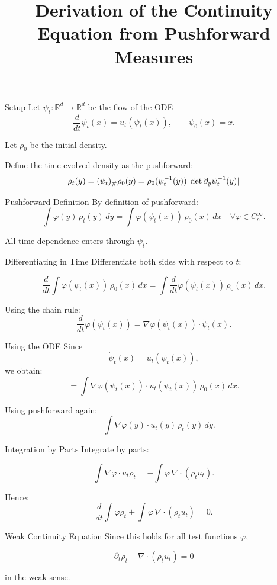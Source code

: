 \documentclass{beamer}
\title{Derivation of the Continuity Equation from Pushforward Measures}
\author{}
\date{}
\begin{document}
\frame{\titlepage}


\begin{frame}{Setup}
Let $\psi_t : \mathbb{R}^d \to \mathbb{R}^d$ be the flow of the ODE
\[
\frac{d}{dt} \psi_t(x) = u_t(\psi_t(x)),
\qquad \psi_0(x) = x.
\]

Let $\rho_0$ be the initial density.

Define the time-evolved density as the pushforward:
\[
\rho_t (y) = (\psi_t)_\# \rho_0 (y) = \rho_0(\psi_t^{-1}(y)) | \operatorname{det} \partial_y \psi_t^{-1}(y)|
\]

\end{frame}


\begin{frame}{Pushforward Definition}
By definition of pushforward:
\[
\int \varphi(y)\,\rho_t(y)\,dy
=
\int \varphi(\psi_t(x))\,\rho_0(x)\,dx
\quad \forall \varphi \in C_c^\infty.
\]

All time dependence enters through $\psi_t$.
\end{frame}


\begin{frame}{Differentiating in Time}
Differentiate both sides with respect to $t$:

\[
\frac{d}{dt}
\int \varphi(\psi_t(x))\,\rho_0(x)\,dx
=
\int
\frac{d}{dt}\varphi(\psi_t(x))\,\rho_0(x)\,dx.
\]

Using the chain rule:
\[
\frac{d}{dt}\varphi(\psi_t(x))
=
\nabla \varphi(\psi_t(x)) \cdot \dot{\psi}_t(x).
\]

\end{frame}


\begin{frame}{Using the ODE}
Since
\[
\dot{\psi}_t(x) = u_t(\psi_t(x)),
\]
we obtain:
\[
=
\int
\nabla \varphi(\psi_t(x)) \cdot u_t(\psi_t(x))\,\rho_0(x)\,dx.
\]

Using pushforward again:
\[
=
\int
\nabla \varphi(y) \cdot u_t(y)\,\rho_t(y)\,dy.
\]

\end{frame}


\begin{frame}{Integration by Parts}
Integrate by parts:

\[
\int
\nabla \varphi \cdot u_t \rho_t
=
-
\int
\varphi \, \nabla \cdot (\rho_t u_t).
\]

Hence:
\[
\frac{d}{dt}
\int \varphi \rho_t
+
\int
\varphi \, \nabla \cdot (\rho_t u_t)
=
0.
\]

\end{frame}


\begin{frame}{Weak Continuity Equation}
Since this holds for all test functions $\varphi$,

\[
\partial_t \rho_t + \nabla \cdot (\rho_t u_t) = 0
\]

in the weak sense.

\end{frame}

\end{document}
